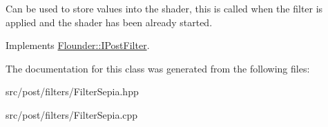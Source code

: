 Can be used to store values into the shader, this is called when the filter is applied and the shader has been already started. 



Implements \hyperlink{class_flounder_1_1_i_post_filter_a20420ec0a9bac67437740552bea9ab74}{Flounder\+::\+I\+Post\+Filter}.



The documentation for this class was generated from the following files\+:\begin{DoxyCompactItemize}
\item 
src/post/filters/Filter\+Sepia.\+hpp\item 
src/post/filters/Filter\+Sepia.\+cpp\end{DoxyCompactItemize}
